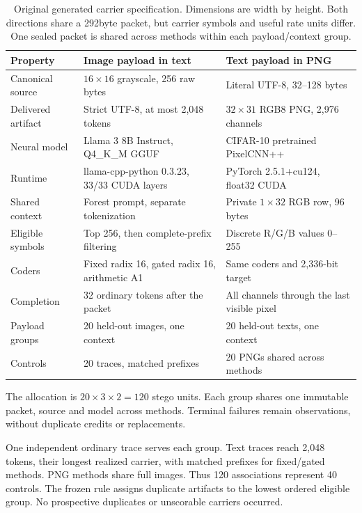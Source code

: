 \documentclass[a4paper,twoside]{article}
\begin{document}
\begin{table}[t]
\caption{Original generated carrier specification. Dimensions are width by height. Both directions share a 292byte packet, but carrier symbols and useful rate units differ. One sealed packet is shared across methods within each payload/context group.}
\label{tab:specification}\centering\small
\begin{tabularx}{\textwidth}{@{}p{2.8cm}YY@{}}
\toprule
Property & Image payload in text & Text payload in PNG \\
\midrule
Canonical source & $16\times16$ grayscale, 256 raw bytes & Literal UTF-8, 32--128 bytes \\
Delivered artifact & Strict UTF-8, at most 2,048 tokens & $32\times31$ RGB8 PNG, 2,976 channels \\
Neural model & Llama 3 8B Instruct, Q4\_K\_M GGUF & CIFAR-10 pretrained PixelCNN++ \\
Runtime & llama-cpp-python 0.3.23, 33/33 CUDA layers & PyTorch 2.5.1+cu124, float32 CUDA \\
Shared context & Forest prompt, separate tokenization & Private $1\times32$ RGB row, 96 bytes \\
Eligible symbols & Top 256, then complete-prefix filtering & Discrete R/G/B values 0--255 \\
Coders & Fixed radix 16, gated radix 16, arithmetic A1 & Same coders and 2,336-bit target \\
Completion & 32 ordinary tokens after the packet & All channels through the last visible pixel \\
Payload groups & 20 held-out images, one context & 20 held-out texts, one context \\
Controls & 20 traces, matched prefixes & 20 PNGs shared across methods \\
\bottomrule
\end{tabularx}
\end{table}

The allocation is $20\times3\times2=120$ stego units. Each group shares one immutable packet, source and model across methods. Terminal failures remain observations, without duplicate credits or replacements.

One independent ordinary trace serves each group. Text traces reach 2,048 tokens, their longest realized carrier, with matched prefixes for fixed/gated methods. PNG methods share full images. Thus 120 associations represent 40 controls. The frozen rule assigns duplicate artifacts to the lowest ordered eligible group. No prospective duplicates or unscorable carriers occurred.
\end{document}

